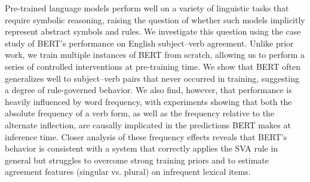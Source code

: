 Pre-trained language models perform well on a variety of linguistic tasks that require symbolic reasoning, raising the question of whether such models implicitly represent abstract symbols and rules. We investigate this question using the case study of BERT's performance on English subject--verb agreement. Unlike prior work, we train multiple instances of BERT from scratch, allowing us to perform a series of controlled interventions at pre-training time. We show that BERT often generalizes well to subject--verb pairs that never occurred in training, suggesting a degree of rule-governed behavior. We also find, however, that performance is heavily influenced by word frequency, with experiments showing that both the absolute frequency of a verb form, as well as the frequency relative to the alternate inflection, are causally implicated in the predictions BERT makes at inference time. Closer analysis of these frequency effects reveals that BERT's behavior is consistent with a system that correctly applies the SVA rule in general but struggles to overcome strong training priors and to estimate agreement features (singular vs. plural) on infrequent lexical items.
